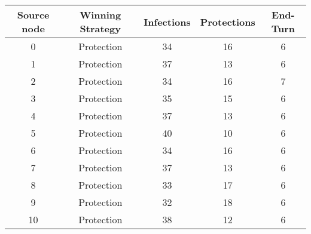 \documentclass[results.tex]{subfiles}
\begin{document}
    \begin{center}
        \begin{tabular}{| c || c | c | c | c |}
            \hline
            {\bfseries Source node} & {\bfseries Winning Strategy} & {\bfseries Infections} & {\bfseries Protections}
            & {\bfseries End-Turn}
            \\  %
            \hline\hline
            0                       & Protection                   & 34                     & 16                      & 6                    \\
            \hline
            1                       & Protection                   & 37                     & 13                      & 6                    \\
            \hline
            2                       & Protection                   & 34                     & 16                      & 7                    \\
            \hline
            3                       & Protection                   & 35                     & 15                      & 6                    \\
            \hline
            4                       & Protection                   & 37                     & 13                      & 6                    \\
            \hline
            5                       & Protection                   & 40                     & 10                      & 6                    \\
            \hline
            6                       & Protection                   & 34                     & 16                      & 6                    \\
            \hline
            7                       & Protection                   & 37                     & 13                      & 6                    \\
            \hline
            8                       & Protection                   & 33                     & 17                      & 6                    \\
            \hline
            9                       & Protection                   & 32                     & 18                      & 6                    \\
            \hline
            10                      & Protection                   & 38                     & 12                      & 6                    \\

\end{tabular}
\end{center}
\end{document}
